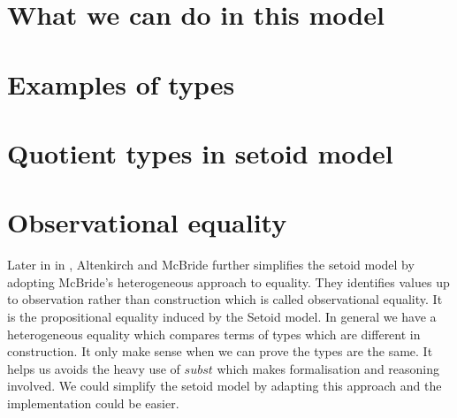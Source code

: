 

\section{What we can do in this model}

\section{Examples of types}









\section{Quotient types in setoid model}





\section{Observational equality}


Later in in \cite{alti:ott-conf}, Altenkirch and McBride further
simplifies the setoid model by adopting McBride's heterogeneous
approach to equality. They identifies values up to observation rather than
  construction which is called observational equality. It is the
  propositional equality induced by the Setoid model.  In general we have a heterogeneous equality which
  compares terms of types which are different in construction. It only
  make sense when we can prove the types are the same. It helps us
  avoids the heavy use of $subst$ which makes formalisation and
  reasoning involved. We could simplify the setoid model by adapting this
  approach and the implementation could be easier.
